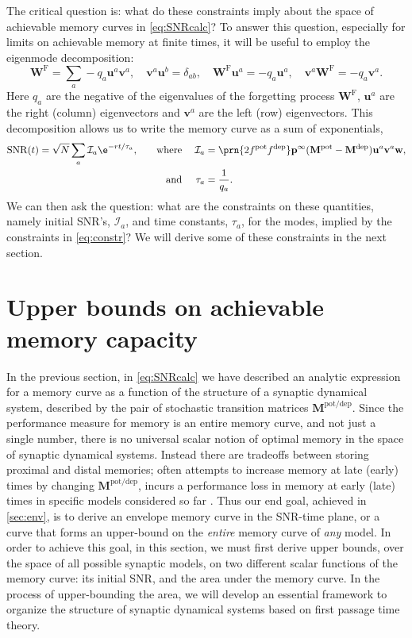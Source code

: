 \documentclass{article} %
\DeclareMathOperator{\snr}{SNR}
\newcommand{\pr}{\mathbf{p}}
\newcommand{\eq}{\pr^\infty}
\newcommand{\w}{\mathbf{w}}
\newcommand{\W}{\mathbf{W}}
\newcommand{\M}{\mathbf{M}}
\newcommand{\frg}{\W^{\mathrm{F}}}
\newcommand{\pot}{^{\text{pot}}}
\newcommand{\dep}{^{\text{dep}}}
\newcommand{\potdep}{^{\text{pot/dep}}}
\newcommand{\uv}{\mathbf{u}}
\newcommand{\vv}{\mathbf{v}}
\newcommand{\CI}{\mathcal{I}}
\begin{document}
The critical question is: what do these constraints imply about the space of achievable memory curves in \eqref{eq:SNRcalc}?
To answer this question, especially for limits on achievable memory at finite times, it will be useful to employ the eigenmode decomposition:
%
\begin{equation}\label{eq:eigendecomp}
  \frg = \sum_a -q_a \uv^a \vv^a,
  \quad
  \vv^a \uv^b = \delta_{ab},
  \quad
  \frg \uv^a = -q_a \uv^a,
  \quad
  \vv^a \frg = -q_a \vv^a.
\end{equation}
%
Here $q_a$ are the negative of the eigenvalues of the forgetting process $\frg$, $\uv^a$ are the right (column) eigenvectors and $\vv^a$ are the left (row) eigenvectors.
This decomposition allows us to write the memory curve as a sum of exponentials,
%
\begin{equation}\label{eq:SNReigen}
\begin{aligned}
  \snr(t) &= \sqrt{N}\sum_a \CI_a \e^{-rt/\tau_a},
  &\quad \text{where}&\;&
  \CI_a &= \prn{2 f\pot f\dep} \eq (\M\pot-\M\dep) \uv^a  \vv^a \w,\\&
  & \text{and}&&
  \tau_a &= \frac{1}{q_a}.
\end{aligned}
\end{equation}
%
We can then ask the question: what are the constraints on these quantities, namely initial SNR's, $\CI_a$, and time constants, $\tau_a$, for the modes,  implied by the constraints in \eqref{eq:constr}?
We will derive some of these constraints in the next section.

\section{Upper bounds on achievable memory capacity}\label{sec:bounds}

In the previous section, in \eqref{eq:SNRcalc} we have described an analytic expression for a memory curve as a function of the structure of a synaptic dynamical system, described by the pair of stochastic transition matrices  $\M\potdep$.
Since the performance measure for memory is an entire memory curve, and not just a single number, there is no universal scalar notion of optimal memory in the space of synaptic dynamical systems.
Instead there are tradeoffs between storing proximal and distal memories;  often attempts to increase memory at late (early) times by changing $\M\potdep$, incurs a performance loss in memory at early (late) times in specific models considered so far \cite{Fusi2005cascade,Fusi2007multistate,Leibold2008serial}.
Thus our end goal, achieved in \autoref{sec:env}, is to derive an envelope memory curve in the SNR-time plane, or a curve that forms an upper-bound on the {\it entire} memory curve of {\it any} model.
In order to achieve this goal, in this section, we must first derive upper bounds, over the space of all possible synaptic models, on two different scalar functions of the memory curve: its initial SNR, and the area under the memory curve.
In the process of upper-bounding the area, we will develop an essential framework to organize the structure of synaptic dynamical systems based on first passage time theory.
\end{document}
